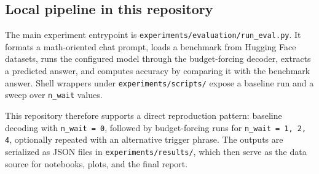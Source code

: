 \subsection{Local pipeline in this repository}

The main experiment entrypoint is \texttt{experiments/evaluation/run\_eval.py}. It formats a math-oriented chat prompt, loads a benchmark from Hugging Face datasets, runs the configured model through the budget-forcing decoder, extracts a predicted answer, and computes accuracy by comparing it with the benchmark answer. Shell wrappers under \texttt{experiments/scripts/} expose a baseline run and a sweep over \texttt{n\_wait} values.

This repository therefore supports a direct reproduction pattern: baseline decoding with \texttt{n\_wait = 0}, followed by budget-forcing runs for \texttt{n\_wait = 1, 2, 4}, optionally repeated with an alternative trigger phrase. The outputs are serialized as JSON files in \texttt{experiments/results/}, which then serve as the data source for notebooks, plots, and the final report.